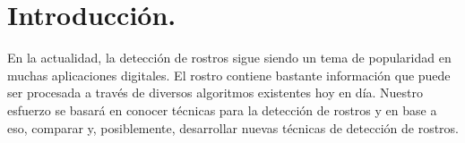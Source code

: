 \documentclass[letterpaper,12pt]{article}
\begin{document}
\newpage

%

\listoffigures

\newpage
\pagestyle{fancy} 	%

\section{Introducción.}

En la actualidad, la detección de rostros sigue siendo un tema de popularidad en muchas aplicaciones digitales. El rostro contiene bastante información que puede ser procesada a través de diversos algoritmos existentes hoy en día. Nuestro esfuerzo se basará en conocer técnicas para la detección de rostros y en base a eso, comparar y, posiblemente, desarrollar nuevas técnicas de detección de rostros.\\
\end{document}
